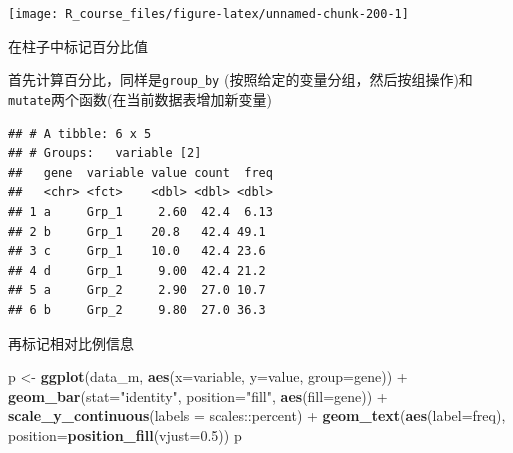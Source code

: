 \documentclass[]{article}
\newenvironment{Shaded}{\begin{snugshade}}{\end{snugshade}}
\newcommand{\KeywordTok}[1]{\textcolor[rgb]{0.13,0.29,0.53}{\textbf{{#1}}}}
\newcommand{\DataTypeTok}[1]{\textcolor[rgb]{0.13,0.29,0.53}{{#1}}}
\newcommand{\DecValTok}[1]{\textcolor[rgb]{0.00,0.00,0.81}{{#1}}}
\newcommand{\FloatTok}[1]{\textcolor[rgb]{0.00,0.00,0.81}{{#1}}}
\newcommand{\StringTok}[1]{\textcolor[rgb]{0.31,0.60,0.02}{{#1}}}
\newcommand{\CommentTok}[1]{\textcolor[rgb]{0.56,0.35,0.01}{\textit{{#1}}}}
\newcommand{\NormalTok}[1]{{#1}}
\numberwithin{figure}{section}
\numberwithin{table}{section}
\theoremstyle{definition}
\theoremstyle{definition}
\theoremstyle{definition}
\theoremstyle{remark}
\begin{document}
\begin{center}\texttt{[image: R\_course\_files/figure-latex/unnamed-chunk-200-1]} \end{center}

在柱子中标记百分比值

首先计算百分比，同样是\texttt{group\_by}
(按照给定的变量分组，然后按组操作)和\texttt{mutate}两个函数(在当前数据表增加新变量)

\begin{Shaded}
\end{Shaded}

\begin{verbatim}
## # A tibble: 6 x 5
## # Groups:   variable [2]
##   gene  variable value count  freq
##   <chr> <fct>    <dbl> <dbl> <dbl>
## 1 a     Grp_1     2.60  42.4  6.13
## 2 b     Grp_1    20.8   42.4 49.1 
## 3 c     Grp_1    10.0   42.4 23.6 
## 4 d     Grp_1     9.00  42.4 21.2 
## 5 a     Grp_2     2.90  27.0 10.7 
## 6 b     Grp_2     9.80  27.0 36.3
\end{verbatim}

再标记相对比例信息

\begin{Shaded}
\begin{Highlighting}[]
\NormalTok{p <-}\StringTok{ }\KeywordTok{ggplot}\NormalTok{(data_m, }\KeywordTok{aes}\NormalTok{(}\DataTypeTok{x=}\NormalTok{variable, }\DataTypeTok{y=}\NormalTok{value, }\DataTypeTok{group=}\NormalTok{gene)) +}
\StringTok{    }\KeywordTok{geom_bar}\NormalTok{(}\DataTypeTok{stat=}\StringTok{"identity"}\NormalTok{, }\DataTypeTok{position=}\StringTok{"fill"}\NormalTok{, }\KeywordTok{aes}\NormalTok{(}\DataTypeTok{fill=}\NormalTok{gene)) +}
\StringTok{    }\KeywordTok{scale_y_continuous}\NormalTok{(}\DataTypeTok{labels =} \NormalTok{scales::percent) +}
\StringTok{    }\KeywordTok{geom_text}\NormalTok{(}\KeywordTok{aes}\NormalTok{(}\DataTypeTok{label=}\NormalTok{freq), }\DataTypeTok{position=}\KeywordTok{position_fill}\NormalTok{(}\DataTypeTok{vjust=}\FloatTok{0.5}\NormalTok{))}
\NormalTok{p}
\end{Highlighting}
\end{Shaded}
\end{document}
